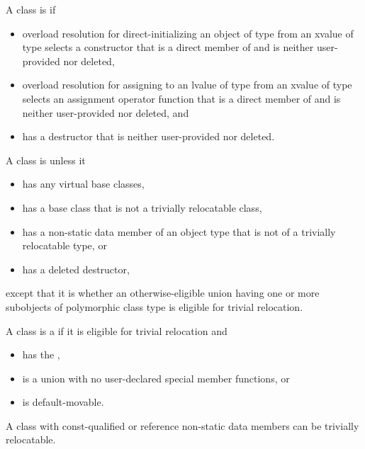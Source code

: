 \pnum
A class  is  if

\begin{itemize}
\item overload resolution for direct-initializing an object of type 
from an xvalue of type  selects a constructor that is a direct member
of  and is neither user-provided nor deleted,

\item overload resolution for assigning to an lvalue of type  from an
xvalue of type  selects an assignment operator function that is a
direct member of  and is neither user-provided nor deleted, and

\item {} has a destructor that is neither user-provided nor deleted.
\end{itemize}

\pnum
A class is  unless it
\begin{itemize}
\item has any virtual base classes,
\item has a base class that is not a trivially relocatable class,
\item has a non-static data member of an object type that is not of a
trivially relocatable type, or

\item has a deleted destructor,
\end{itemize}
except that it is 
whether an otherwise-eligible union having one or more subobjects of
polymorphic class type is eligible for trivial relocation.

\pnum
A class  is a 
if it is eligible for trivial relocation and
\begin{itemize}
\item has the  ,
\item is a union with no user-declared special member functions, or
\item is default-movable.
\end{itemize}

\pnum
\begin{note}
A class with const-qualified or reference non-static data members can be
trivially relocatable.
\end{note}

